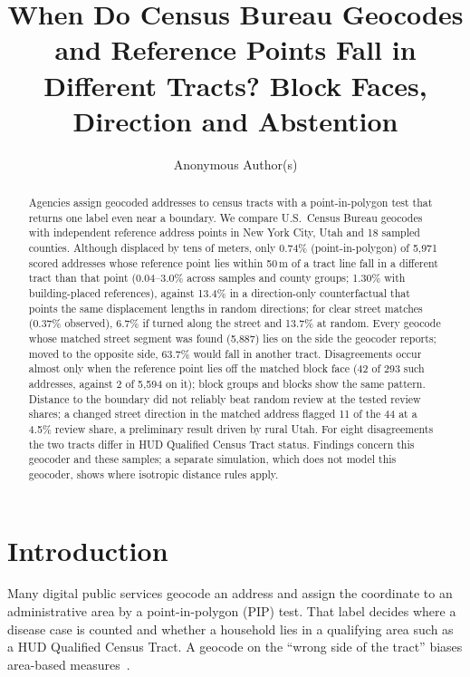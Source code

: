 \documentclass[runningheads]{llncs}
\begin{document}
\title{When Do Census Bureau Geocodes and Reference Points Fall in Different Tracts? Block Faces, Direction and Abstention}
\author{Anonymous Author(s)}

\maketitle

\begin{abstract}
Agencies assign geocoded addresses to census tracts with a point-in-polygon test that returns one label even near a boundary. We compare U.S.\ Census Bureau geocodes with independent reference address points in New York City, Utah and 18 sampled counties. Although displaced by tens of meters, only 0.74\% (point-in-polygon) of 5{,}971 scored addresses whose reference point lies within 50\,m of a tract line fall in a different tract than that point (0.04--3.0\% across samples and county groups; 1.30\% with building-placed references), against 13.4\% in a direction-only counterfactual that points the same displacement lengths in random directions; for clear street matches (0.37\% observed), 6.7\% if turned along the street and 13.7\% at random. Every geocode whose matched street segment was found (5{,}887) lies on the side the geocoder reports; moved to the opposite side, 63.7\% would fall in another tract. Disagreements occur almost only when the reference point lies off the matched block face (42 of 293 such addresses, against 2 of 5{,}594 on it); block groups and blocks show the same pattern. Distance to the boundary did not reliably beat random review at the tested review shares; a changed street direction in the matched address flagged 11 of the 44 at a 4.5\% review share, a preliminary result driven by rural Utah. For eight disagreements the two tracts differ in HUD Qualified Census Tract status. Findings concern this geocoder and these samples; a separate simulation, which does not model this geocoder, shows where isotropic distance rules apply.
\end{abstract}

\section{Introduction}
Many digital public services geocode an address and assign the coordinate to an administrative area by a point-in-polygon (PIP) test. That label decides where a disease case is counted and whether a household lies in a qualifying area such as a HUD Qualified Census Tract. A geocode on the ``wrong side of the tract'' biases area-based measures~\cite{krieger2001,krieger2002,rushton2006}.
\end{document}
